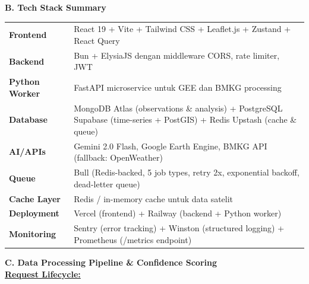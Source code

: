 \documentclass[12pt,a4paper]{article}
\newcommand{\subsectionbox}[1]{%
  \textbf{\large #1}\\[0.3cm]
}
\begin{document}
\vspace{0.5cm}

\subsectionbox{B. Tech Stack Summary}

\begin{tabularx}{\textwidth}{|l|X|}
  \hline
  \textbf{Frontend} & React 19 + Vite + Tailwind CSS + Leaflet.js + Zustand + React Query \\[0.2cm]
  \textbf{Backend} & Bun + ElysiaJS dengan middleware CORS, rate limiter, JWT \\[0.2cm]
  \textbf{Python Worker} & FastAPI microservice untuk GEE dan BMKG processing \\[0.2cm]
  \textbf{Database} & MongoDB Atlas (observations \& analysis) + PostgreSQL Supabase (time-series + PostGIS) + Redis Upstash (cache \& queue) \\[0.2cm]
  \textbf{AI/APIs} & Gemini 2.0 Flash, Google Earth Engine, BMKG API (fallback: OpenWeather) \\[0.2cm]
  \textbf{Queue} & Bull (Redis-backed, 5 job types, retry 2x, exponential backoff, dead-letter queue) \\[0.2cm]
  \textbf{Cache Layer} & Redis / in-memory cache untuk data satelit \\[0.2cm]
  \textbf{Deployment} & Vercel (frontend) + Railway (backend + Python worker) \\[0.2cm]
  \textbf{Monitoring} & Sentry (error tracking) + Winston (structured logging) + Prometheus (/metrics endpoint) \\
  \hline
\end{tabularx}

\vspace{0.5cm}

\subsectionbox{C. Data Processing Pipeline \& Confidence Scoring}

\textbf{\underline{Request Lifecycle:}}
\end{document}
